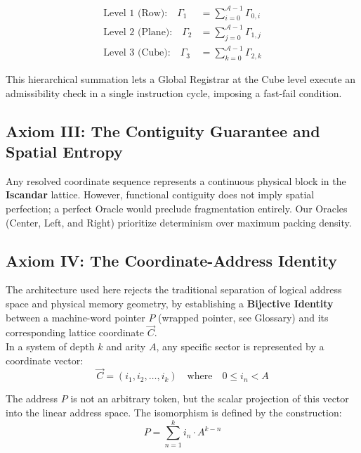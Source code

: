 \documentclass[11pt]{article}
\begin{document}
\begin{align}
  \text{Level 1 (Row):} \quad \Gamma_{1} &= \sum_{i=0}^{\mathcal{A}-1}\Gamma_{0,i} \label{eq:gamma1} \\
  \text{Level 2 (Plane):} \quad \Gamma_{2} &= \sum_{j=0}^{\mathcal{A}-1}\Gamma_{1,j} \label{eq:gamma2} \\
  \text{Level 3 (Cube):} \quad \Gamma_{3} &= \sum_{k=0}^{\mathcal{A}-1}\Gamma_{2,k} \label{eq:gamma3}
\end{align}

This hierarchical summation lets a Global Registrar at the Cube level execute an admissibility check in a single instruction cycle, imposing a fast-fail condition.

\subsection{Axiom III: The Contiguity Guarantee and Spatial Entropy}

Any resolved coordinate sequence represents a continuous physical block in the \textbf{Iscandar} lattice. However, functional contiguity does not imply spatial perfection; a perfect Oracle would preclude fragmentation entirely. Our Oracles (Center, Left, and Right) prioritize determinism over maximum packing density. 

\subsection{Axiom IV: The Coordinate-Address Identity}

The architecture used here rejects the traditional separation of logical address space and physical memory geometry, by establishing a \textbf{Bijective Identity} between a machine-word pointer $P$ (wrapped pointer, see Glossary) and its corresponding lattice coordinate $\vec{C}$.\\ 

In a system of depth $k$ and arity $A$, any specific sector is represented by a coordinate vector:
\begin{equation}
    \vec{C} = (i_1, i_2, \dots, i_k) \quad \text{where} \quad 0 \leq i_n < A
\end{equation}

The address $P$ is not an arbitrary token, but the scalar projection of this vector into the linear address space. The isomorphism is defined by the construction:
\begin{equation}
    P = \sum_{n=1}^{k} i_n \cdot A^{k-n}
\end{equation}
\end{document}
